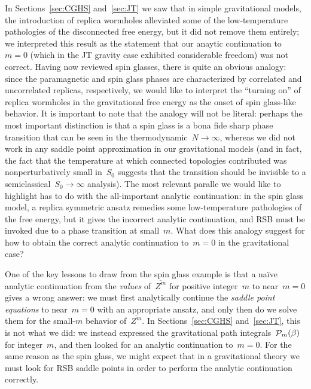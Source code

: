\documentclass[12pt]{article}
\begin{document}
In Sections~\ref{sec:CGHS} and~\ref{sec:JT} we saw that in simple gravitational models, the introduction of replica wormholes alleviated some of the low-temperature pathologies of the disconnected free energy, but it did not remove them entirely; we interpreted this result as the statement that our anaytic continuation to~$m = 0$ (which in the JT gravity case exhibited considerable freedom) was not correct.  Having now reviewed spin glasses, there is quite an obvious analogy: since the paramagnetic and spin glass phases are characterized by correlated and uncorrelated replicas, respectively, we would like to interpret the ``turning on'' of replica wormholes in the gravitational free energy as the onset of spin glass-like behavior.  It is important to note that the analogy will not be literal: perhaps the most important distinction is that a spin glass is a bona fide sharp phase transition that can be seen in the thermodynamic~$N \to \infty$, whereas we did not work in any saddle point approximation in our gravitational models (and in fact, the fact that the temperature at which connected topologies contributed was nonperturbatively small in~$S_0$ suggests that the transition should be invisible to a semiclassical~$S_0 \to \infty$ analysis).  The most relevant paralle we would like to highlight has to do with the all-important analytic continuation: in the spin glass model, a replica symmetric ansatz remedies some low-temperature pathologies of the free energy, but it gives the incorrect analytic continuation, and RSB must be invoked due to a phase transition at small~$m$.  What does this analogy suggest for how to obtain the correct analytic continuation to~$m = 0$ in the gravitational case?

One of the key lessons to draw from the spin glass example is that a na\"ive analytic continuation from the \textit{values} of~$\overline{Z^m}$ for positive integer~$m$ to near~$m = 0$ gives a wrong answer: we must first analytically continue the \textit{saddle point equations} to near~$m = 0$ with an appropriate ansatz, and only then do we solve them for the small-$m$ behavior of~$\overline{Z^m}$.  In Sections~\ref{sec:CGHS} and~\ref{sec:JT}, this is not what we did: we instead expressed the gravitational path integrals~$\mathcal{P}_m(\beta)$ for integer~$m$, and then looked for an analytic continuation to~$m = 0$.  For the same reason as the spin glass, we might expect that in a gravitational theory we must look for RSB saddle points in order to perform the analytic continuation correctly.
\end{document}
